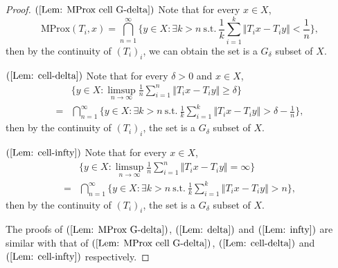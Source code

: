 \documentclass[12pt,a4paper]{amsart}
\theoremstyle{definition}
\theoremstyle{plain}
\begin{document}
\begin{proof}
    $(\ref{Lem: MProx cell G-delta})$ Note that for every $x\in X$,
    \[
        \text{MProx}(T_i,x)=\bigcap_{n=1}^{\infty}\biggl\{ y\in X: \exists k>n  \ \text{s.t.} \  \frac{1}{k} \sum_{i=1}^{k}\Vert T_ix-T_iy \Vert <\frac{1}{n} \biggr\},
    \]
    then by the continuity of $(T_i)_i$, we can obtain the set is a $G_{\delta}$ subset of $X$.

    $(\ref{Lem: cell-delta})$ Note that for every $\delta>0$ and $x\in X$,
    \begin{align*}
          & \biggl\{ y\in X: \limsup_{n\to \infty} \frac{1}{n} \sum_{i=1}^n\Vert T_ix-T_iy \Vert \ge \delta\biggr\} \\
        = & \bigcap_{n=1}^{\infty}\biggl\{ y\in X: \exists k>n  \ \text{s.t.} \  \frac{1}{k} \sum_{i=1}^{k}\Vert T_ix-T_iy \Vert >\delta-\frac{1}{n} \biggr\},
    \end{align*}
   then by the continuity of $(T_i)_i$, the set is a $G_{\delta}$ subset of $X$.

    $(\ref{Lem: cell-infty})$ Note that for every $x\in X$,
    \begin{align*}
          & \biggl\{ y\in X: \limsup_{n\to \infty} \frac{1}{n} \sum_{i=1}^n\Vert T_ix-T_iy \Vert = \infty \biggr\}  \\
        = & \bigcap_{n=1}^{\infty}\biggl\{ y\in X: \exists k>n  \ \text{s.t.} \  \frac{1}{k} \sum_{i=1}^{k}\Vert T_ix-T_iy \Vert >n \biggr\},
    \end{align*}
    then by the continuity of $(T_i)_i$, the set is a $G_{\delta}$ subset of $X$.
    
    The proofs of $(\ref{Lem: MProx G-delta})$, $(\ref{Lem: delta})$ and $(\ref{Lem: infty})$ are similar with that of $(\ref{Lem: MProx cell G-delta})$, $(\ref{Lem: cell-delta})$ and $(\ref{Lem: cell-infty})$ respectively.
\end{proof}
\end{document}
